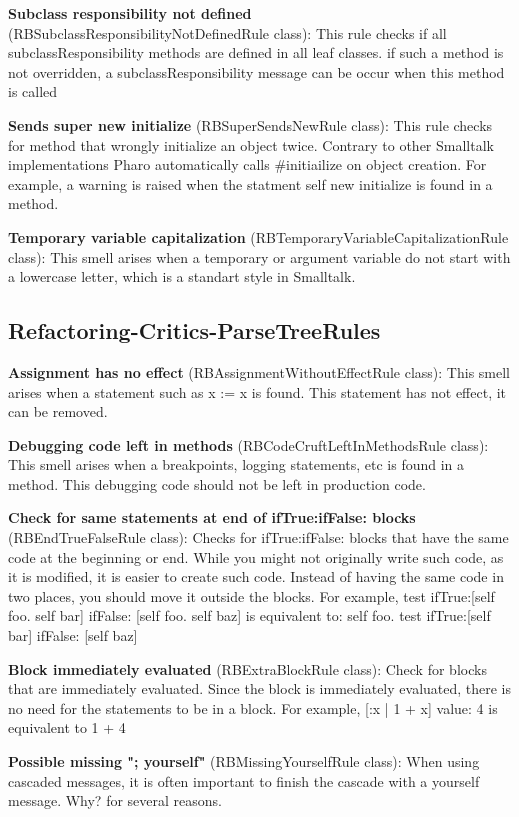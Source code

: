 \textbf{Subclass responsibility not defined} (RBSubclassResponsibilityNotDefinedRule class): This rule checks if all subclassResponsibility methods are defined in all leaf classes. if such a method is not overridden, a subclassResponsibility message can be occur when this method is called

\textbf{Sends super new initialize} (RBSuperSendsNewRule class):  This rule checks for method that wrongly initialize an object twice. Contrary to other Smalltalk implementations Pharo automatically calls \#initiailize on object creation.
For example, a warning is raised when the statment self new initialize is found in a method.

\textbf{Temporary variable capitalization} (RBTemporaryVariableCapitalizationRule class): This smell arises when a temporary or argument variable do not start with a lowercase letter, which is a standart style in Smalltalk.

\subsection{Refactoring-Critics-ParseTreeRules}
\textbf{Assignment has no effect} (RBAssignmentWithoutEffectRule class): This smell arises when a statement such as x := x is found. This statement has not effect, it can be removed.

\textbf{Debugging code left in methods} (RBCodeCruftLeftInMethodsRule class): This smell arises when a breakpoints, logging statements, etc is found in a method. This debugging code should not be left in production code.

\textbf{Check for same statements at end of ifTrue:ifFalse: blocks} (RBEndTrueFalseRule class): Checks for ifTrue:ifFalse: blocks that have the same code at the beginning or end. While you might not originally write such code, as it is modified, it is easier to create such code. Instead of having the same code in two places, you should move it outside the blocks.
For example, 
test 
	ifTrue:[self foo. self bar] 
	ifFalse: [self foo. self baz]
 is equivalent to: 
self foo.  
test 
	ifTrue:[self bar] 
	ifFalse: [self baz]

\textbf{Block immediately evaluated} (RBExtraBlockRule class): Check for blocks that are immediately evaluated. Since the block is immediately evaluated, there is no need for the statements to be in a block.
For example, [:x | 1 + x] value: 4 is equivalent to 1 + 4

\textbf{Possible missing "; yourself"} (RBMissingYourselfRule class): When using cascaded messages, it is often important to finish the cascade with a yourself message. Why? for several reasons. 
	
